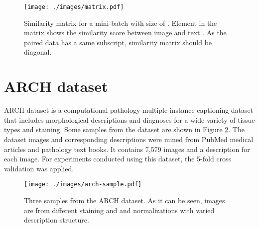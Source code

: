 \documentclass{midl}
\begin{document}
\begin{figure}[h!]
    \centering
    \texttt{[image: ./images/matrix.pdf]}
    \caption{Similarity matrix for a mini-batch with size of . Element  in the matrix shows the similarity score between image  and text . As the paired data has a same subscript, similarity matrix should be diagonal. }
    \label{matrix}
\end{figure}

\section{ARCH dataset}\label{appb} ARCH dataset\cite{gamper2021multiple} is a computational pathology multiple-instance captioning dataset that includes morphological descriptions and diagnoses for a wide variety of tissue types and staining. Some samples from the dataset are shown in Figure \ref{arch-dataset-sample}. The dataset images and corresponding descriptions were mined from PubMed medical articles and pathology text books. It contains 7,579 images and a description for each image. For experiments conducted using this dataset, the 5-fold cross validation was applied.


\begin{figure}
    \centering
    \texttt{[image: ./images/arch-sample.pdf]}
    \caption{Three samples from the ARCH dataset. As it can be seen, images are from different staining and and normalizations with varied description structure.}
    \label{arch-dataset-sample}
\end{figure}
\end{document}

